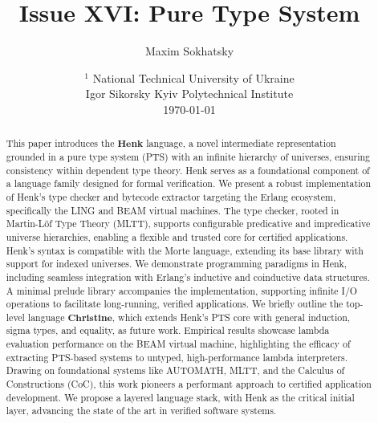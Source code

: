 \documentclass{article}
\begin{document}
\title{Issue XVI: Pure Type System}
\author{Maxim Sokhatsky}
\date{ $^1$ National Technical University of Ukraine \\
       \small Igor Sikorsky Kyiv Polytechnical Institute\\
       \today }

\maketitle

\begin{abstract}
This paper introduces the $\mathbf{Henk}$ language, a novel intermediate
representation grounded in a pure type system (PTS) with an infinite
hierarchy of universes, ensuring consistency within dependent type theory.
Henk serves as a foundational component of a language family designed for
formal verification. We present a robust implementation of Henk’s type
checker and bytecode extractor targeting the Erlang ecosystem, specifically
the LING and BEAM virtual machines. The type checker, rooted in Martin-Löf
Type Theory (MLTT), supports configurable predicative and impredicative
universe hierarchies, enabling a flexible and trusted core for certified
applications. Henk’s syntax is compatible with the Morte language, extending
its base library with support for indexed universes. We demonstrate programming
paradigms in Henk, including seamless integration with Erlang’s inductive and
coinductive data structures. A minimal prelude library accompanies the
implementation, supporting infinite I/O operations to facilitate long-running,
verified applications. We briefly outline the top-level language $\mathbf{Christine}$,
which extends Henk’s PTS core with general induction, sigma types, and equality,
as future work. Empirical results showcase lambda evaluation performance on the
BEAM virtual machine, highlighting the efficacy of extracting PTS-based systems
to untyped, high-performance lambda interpreters. Drawing on foundational systems
like AUTOMATH, MLTT, and the Calculus of Constructions (CoC), this work pioneers
a performant approach to certified application development. We propose a layered
language stack, with Henk as the critical initial layer, advancing the state
of the art in verified software systems.
\end{abstract}

\ifincludeTOC
  \tableofcontents
\fi

\newpage
\end{document}
